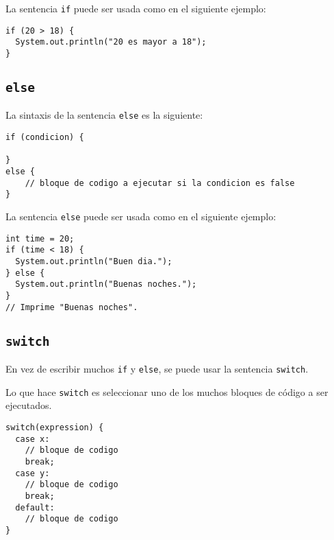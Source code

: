 \documentclass[12pt]{article}
\theoremstyle{largebreak}
\begin{document}
    \begin{exa}
        La sentencia \lstinline|if| puede ser usada como en el siguiente ejemplo:
        \begin{lstlisting}[caption={Uso de la sentencia \lstinline|if|.},label=DescriptiveLabel]
if (20 > 18) {
  System.out.println("20 es mayor a 18");
}
        \end{lstlisting}
    \end{exa}

    \subsection{\lstinline|else|}

    La sintaxis de la sentencia \lstinline|else| es la siguiente:
    \begin{lstlisting}[caption={Sintaxis de la sentencia \lstinline|else|.},label=DescriptiveLabel]
if (condicion) {

}
else {
    // bloque de codigo a ejecutar si la condicion es false
}
    \end{lstlisting}

    \begin{exa}
        La sentencia \lstinline|else| puede ser usada como en el siguiente ejemplo:
        \begin{lstlisting}[caption={Uso de la sentencia \lstinline|else|.},label=DescriptiveLabel]
int time = 20;
if (time < 18) {
  System.out.println("Buen dia.");
} else {
  System.out.println("Buenas noches.");
}
// Imprime "Buenas noches".
        \end{lstlisting}
    \end{exa}

    \subsection{\lstinline|switch|}

    En vez de escribir muchos \lstinline|if| y \lstinline|else|, se puede usar la sentencia \lstinline|switch|.

    Lo que hace \lstinline|switch| es seleccionar uno de los muchos bloques de código a ser ejecutados.

    \begin{lstlisting}[caption={Sintaxis de la sentencia \lstinline|switch|.},label=DescriptiveLabel]
switch(expression) {
  case x:
    // bloque de codigo
    break;
  case y:
    // bloque de codigo
    break;
  default:
    // bloque de codigo
}
    \end{lstlisting}
\end{document}
